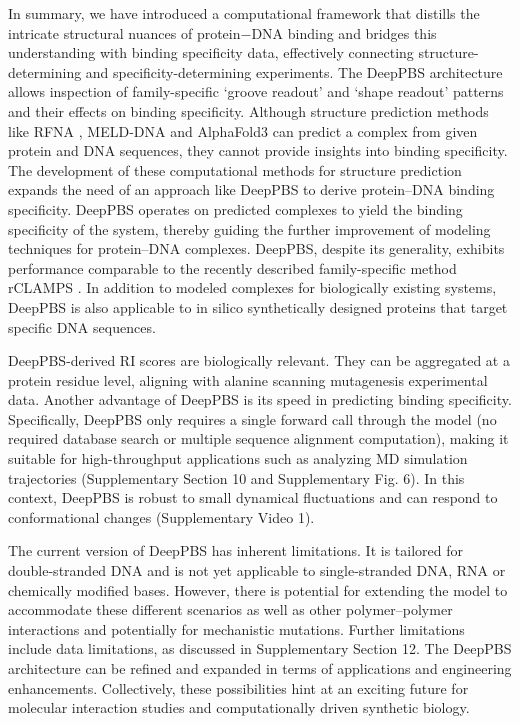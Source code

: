 \par
In summary, we have introduced a computational framework that distills the intricate structural nuances of protein$-$DNA binding and bridges this understanding with binding specificity data, effectively connecting structure-determining and specificity-determining experiments. The DeepPBS architecture allows inspection of family-specific ‘groove readout’ and ‘shape readout’ patterns and their effects on binding specificity. Although structure prediction methods like RFNA \citep{baek2024na}, MELD-DNA \citep{Esmaeeli2023} and AlphaFold3 \citep{Abramson2024} can predict a complex from given protein and DNA sequences, they cannot provide insights into binding specificity. The development of these computational methods for structure prediction expands the need of an approach like DeepPBS to derive protein–DNA binding specificity. DeepPBS operates on predicted complexes to yield the binding specificity of the system, thereby guiding the further improvement of modeling techniques for protein–DNA complexes. DeepPBS, despite its generality, exhibits performance comparable to the recently described family-specific method rCLAMPS \citep{Wetzel2022}. In addition to modeled complexes for biologically existing systems, DeepPBS is also applicable to in silico synthetically designed proteins that target specific DNA sequences.
\par
DeepPBS-derived RI scores are biologically relevant. They can be aggregated at a protein residue level, aligning with alanine scanning mutagenesis experimental data. Another advantage of DeepPBS is its speed in predicting binding specificity. Specifically, DeepPBS only requires a single forward call through the model (no required database search or multiple sequence alignment computation), making it suitable for high-throughput applications such as analyzing MD simulation trajectories (Supplementary Section 10 and Supplementary Fig. 6). In this context, DeepPBS is robust to small dynamical fluctuations and can respond to conformational changes (Supplementary Video 1).
\par
The current version of DeepPBS has inherent limitations. It is tailored for double-stranded DNA and is not yet applicable to single-stranded DNA, RNA or chemically modified bases. However, there is potential for extending the model to accommodate these different scenarios as well as other polymer–polymer interactions and potentially for mechanistic mutations. Further limitations include data limitations, as discussed in Supplementary Section 12. The DeepPBS architecture can be refined and expanded in terms of applications and engineering enhancements. Collectively, these possibilities hint at an exciting future for molecular interaction studies and computationally driven synthetic biology. 

